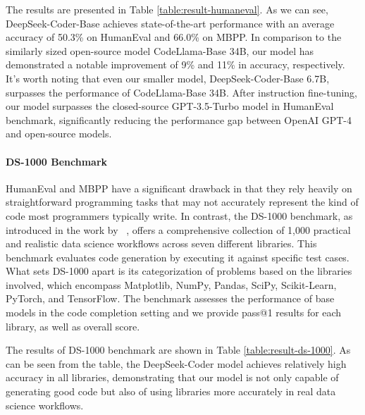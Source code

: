 The results are presented in Table \ref{table:result-humaneval}. As we can see, DeepSeek-Coder-Base achieves state-of-the-art performance with an average accuracy of 50.3\% on HumanEval and 66.0\% on MBPP. In comparison to the similarly sized open-source model CodeLlama-Base 34B, our model has demonstrated a notable improvement of 9\% and 11\% in accuracy, respectively. It's worth noting that even our smaller model, DeepSeek-Coder-Base 6.7B, surpasses the performance of CodeLlama-Base 34B. After instruction fine-tuning, our model surpasses the closed-source GPT-3.5-Turbo model in HumanEval benchmark, significantly reducing the performance gap between OpenAI GPT-4 and open-source models.

\paragraph{DS-1000 Benchmark} HumanEval and MBPP have a significant drawback in that they rely heavily on straightforward programming tasks that may not accurately represent the kind of code most programmers typically write. In contrast, the DS-1000 benchmark, as introduced in the work by  ~\cite{lai2023ds}, offers a comprehensive collection of 1,000 practical and realistic data science workflows across seven different libraries. This benchmark evaluates code generation by executing it against specific test cases. What sets DS-1000 apart is its categorization of problems based on the libraries involved, which encompass Matplotlib, NumPy, Pandas, SciPy, Scikit-Learn, PyTorch, and TensorFlow. The benchmark assesses the performance of base models in the code completion setting and we provide pass@1 results for each library, as well as overall score.

The results of DS-1000 benchmark are shown in Table \ref{table:result-ds-1000}. As can be seen from the table, the DeepSeek-Coder model achieves relatively high accuracy in all libraries, demonstrating that our model is not only capable of generating good code but also of using libraries more accurately in real data science workflows.

